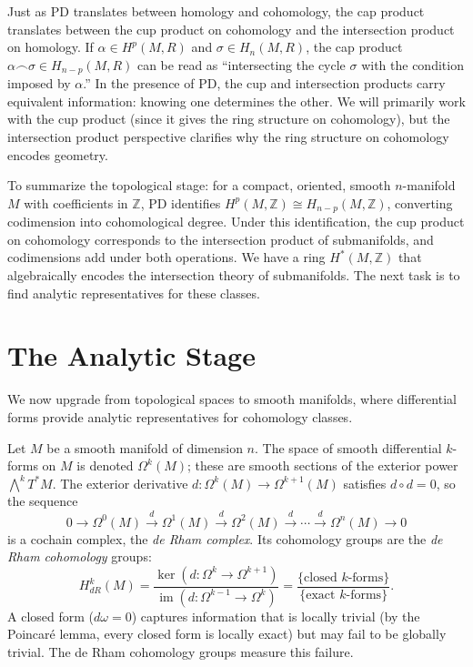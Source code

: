 \documentclass{article}
\newcommand{\Z}{{\mathbb{Z}}}
\newcommand{\im}{\operatorname{im}}
\begin{document}
Just as PD translates between homology and cohomology, the cap product
translates between the cup product on cohomology and the intersection product
on homology. If $\alpha \in H^p(M, R)$ and $\sigma \in H_n(M, R)$, the cap
product $\alpha \frown \sigma \in H_{n-p}(M, R)$ can be read as ``intersecting
the cycle $\sigma$ with the condition imposed by $\alpha$.'' In the presence of
PD, the cup and intersection products carry equivalent information: knowing one
determines the other. We will primarily work with the cup product (since it
gives the ring structure on cohomology), but the intersection product
perspective clarifies why the ring structure on cohomology encodes geometry.

To summarize the topological stage: for a compact, oriented, smooth
$n$-manifold $M$ with coefficients in $\Z$, PD identifies $H^p(M, \Z) \cong
H_{n-p}(M, \Z)$, converting codimension into cohomological degree. Under this
identification, the cup product on cohomology corresponds to the intersection
product of submanifolds, and codimensions add under both operations. We have a
ring $H^*(M, \Z)$ that algebraically encodes the intersection theory of
submanifolds. The next task is to find analytic representatives for these
classes.


\section{The Analytic Stage}\label{sec:analysis}

We now upgrade from topological spaces to smooth manifolds, where differential
forms provide analytic representatives for cohomology classes.

Let $M$ be a smooth manifold of dimension $n$. The space of smooth differential
$k$-forms on $M$ is denoted $\Omega^k(M)$; these are smooth sections of the
exterior power $\bigwedge^k T^*M$. The exterior derivative
$d: \Omega^k(M) \to \Omega^{k+1}(M)$ satisfies $d \circ d = 0$, so the
sequence
\[
  0 \longrightarrow \Omega^0(M) \xrightarrow{\;d\;} \Omega^1(M)
    \xrightarrow{\;d\;} \Omega^2(M) \xrightarrow{\;d\;} \cdots
    \xrightarrow{\;d\;} \Omega^n(M) \longrightarrow 0
\]
is a cochain complex, the \emph{de Rham complex}. Its cohomology groups are the
\emph{de Rham cohomology} groups:
\[
  H^k_{dR}(M) = \frac{\ker(d: \Omega^k \to \Omega^{k+1})}
    {\im(d: \Omega^{k-1} \to \Omega^k)}
  = \frac{\{\text{closed $k$-forms}\}}{\{\text{exact $k$-forms}\}}.
\]
A closed form ($d\omega = 0$) captures information that is locally trivial
(by the Poincar\'{e} lemma, every closed form is locally exact) but may fail to
be globally trivial. The de Rham cohomology groups measure this failure.
\end{document}
